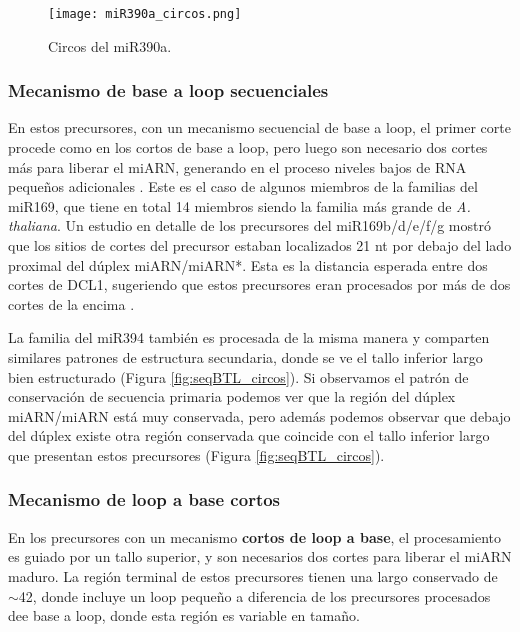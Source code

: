 \begin{figure}[htbp!] 
    \centering    
    \texttt{[image: miR390a\_circos.png]}
    \caption[Circos del miR172a]{Circos del miR390a.}
     \label{fig:miR390a_circos}
\end{figure}

\subsubsection{Mecanismo de base a loop secuenciales}

En estos precursores, con un mecanismo secuencial de base a loop, el primer corte procede como en los cortos de base a loop, pero luego son necesario dos cortes más para liberar el miARN, generando en el proceso niveles bajos de RNA pequeños adicionales \citep{Bologna2013}.
Este es el caso de algunos miembros de la  familias del miR169, que tiene en total 14 miembros siendo la familia más grande de \textit{A. thaliana}.
Un estudio en detalle de los precursores del miR169b/d/e/f/g mostró que los sitios de cortes del precursor estaban localizados 21 nt por debajo del lado proximal del dúplex miARN/miARN*.
Esta es la distancia esperada entre dos cortes de DCL1, sugeriendo que estos precursores eran procesados por más de dos cortes de la encima \citep{Bologna2013}.

La familia del miR394 también es procesada de la misma manera y comparten similares patrones de estructura secundaria, donde se ve el tallo inferior largo bien estructurado (Figura \ref{fig:seqBTL_circos}).
Si observamos el patrón de conservación de secuencia primaria podemos ver que la región del dúplex miARN/miARN está muy conservada, pero además podemos observar que debajo del dúplex existe otra región conservada que coincide con el tallo inferior largo que presentan estos precursores (Figura \ref{fig:seqBTL_circos}).

\subsubsection{Mecanismo de loop a base cortos}

En los precursores con un mecanismo \textbf{cortos de loop a base}, el procesamiento es guiado por un tallo superior, y son necesarios dos cortes para liberar el miARN maduro.
La región terminal de estos precursores tienen una largo conservado de $\sim$42, donde incluye un loop pequeño \citep{Bologna2013} a diferencia de los precursores procesados dee base a loop, donde esta región es variable en tamaño.

